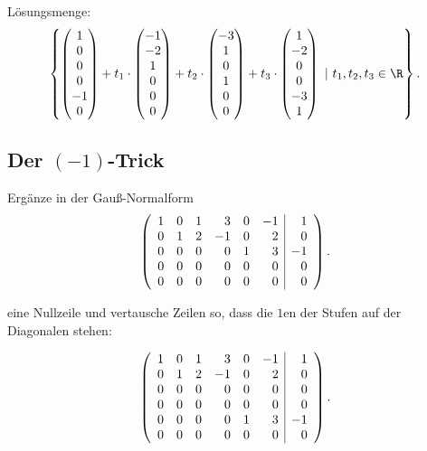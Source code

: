 L\"osungsmenge:
$$
	\left\{
		\begin{pmatrix}
			1\\
			0\\
			0\\
			0\\
			-1\\
			0
		\end{pmatrix}
		+
		t_1 \cdot
		\begin{pmatrix}
			-1\\
			-2\\
			1\\
			0\\
			0\\
			0
		\end{pmatrix}	
		+t_2\cdot
		\begin{pmatrix}
			-3\\
			1\\
			0\\
			1\\
			0\\
			0
		\end{pmatrix}	
		+t_3\cdot
		\begin{pmatrix}
			1\\
			-2\\
			0\\
			0\\
			-3\\
			1
		\end{pmatrix}	
		~|~
		t_1, t_2, t_3 \in \R	
	\right\}.
$$

\newpage
\subsection*{Der $(-1)$-Trick}

Erg\"anze in der Gau{\ss}-Normalform 
$$
	\left(
	\begin{array}{rrrrrr | r}
		1	& 0	& 1	& 3	& 0	& -1	& 1\\	
		0	& 1	& 2	& -1	& 0	& 2	& 0\\
		0	& 0	& 0	& 0 	& 1	& 3	& -1\\
		0	& 0	& 0	& 0	& 0	& 0	& 0\\
		0	& 0	& 0	& 0	& 0	& 0	& 0
	\end{array}
	\right).
$$

eine Nullzeile und vertausche Zeilen so, dass die $1$en der Stufen auf der Diagonalen stehen:

$$
	\left(
	\begin{array}{rrrrrr | r}
		1	& 0	& 1	& 3	& 0	& -1	& 1\\	
		0	& 1	& 2	& -1	& 0	& 2	& 0\\
		0	& 0	& 0	& 0	& 0	& 0	& 0\\
		0	& 0	& 0	& 0	& 0	& 0	& 0\\
		0	& 0	& 0	& 0 	& 1	& 3	& -1\\
		0	& 0	& 0	& 0	& 0	& 0	& 0
	\end{array}
	\right).
$$

